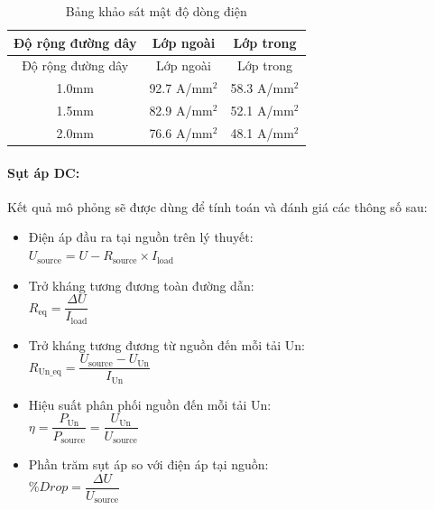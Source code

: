                 \begin{longtable}{|c|c|c|}
                    \caption{Bảng khảo sát mật độ dòng điện}\\
                    \hline
                    Độ rộng đường dây & Lớp ngoài & Lớp trong \\
                    \hline
                    \endfirsthead
                    
                    \hline
                    Độ rộng đường dây & Lớp ngoài & Lớp trong \\
                    \hline
                    \endhead
                    
                    \hline
                    \endfoot
                    
                    \hline
                    \endlastfoot
                    
                    1.0mm & 92.7 A/mm$^2$ & 58.3 A/mm$^2$ \\
                    1.5mm & 82.9 A/mm$^2$ & 52.1 A/mm$^2$ \\
                    2.0mm & 76.6 A/mm$^2$ & 48.1 A/mm$^2$ 
                    \label{tab:current_density_survey}\\

                    \hline
                \end{longtable}

            \paragraph{Sụt áp DC:}
                Kết quả mô phỏng sẽ được dùng để tính toán và đánh giá các thông số sau:
                \begin{itemize}
                    \item Điện áp đầu ra tại nguồn trên lý thuyết:\\ $U_{\text{source}} = U - R_{\text{source}} \times I_{\text{load}}$
                    \item Trở kháng tương đương toàn đường dẫn:\\ $R_{\text{eq}} = \dfrac{\Delta U}{I_{\text{load}}}$
                    \item Trở kháng tương đương từ nguồn đến mỗi tải Un:\\ $R_{\text{Un\_eq}} = \dfrac{U_{\text{source}} - U_{\text{Un}}}{I_{\text{Un}}}$
                    \item Hiệu suất phân phối nguồn đến mỗi tải Un:\\ $\eta = \dfrac{P_{\text{Un}}}{P_{\text{source}}} = \dfrac{U_{\text{Un}}}{U_{\text{source}}}$
                    \item Phần trăm sụt áp so với điện áp tại nguồn:\\ $\%Drop = \dfrac{\Delta U}{U_{\text{source}}}$
                \end{itemize}


